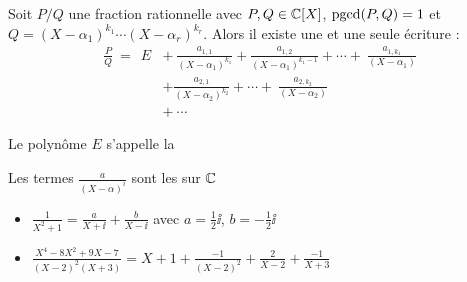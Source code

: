 \begin{frame}
\begin{theoreme}
Soit $P/Q$ une fraction rationnelle avec $P,Q \in \mathbb{C}[X]$, $\mathop{\text{pgcd}}\nolimits(P,Q)=1$ et 
$Q=(X-\alpha_1)^{k_1}\cdots(X-\alpha_r)^{k_r}$. 
Alors il existe une et une seule écriture :
\pause
$$\begin{array}{rl}
\displaystyle \frac{P}{Q} \  =  \ \  E  & + \ 
 \displaystyle  \frac{a_{1,1}}{(X-\alpha_1)^{k_1}}+\frac{a_{1,2}}{(X-\alpha_1)^{k_1-1}}+\cdots
+\ \frac{a_{1,k_1}}{(X-\alpha_1)} \\[4mm]
  & \displaystyle+ \frac{a_{2,1}}{(X-\alpha_2)^{k_2}}+\cdots
+\ \frac{a_{2,k_2}}{(X-\alpha_2)} \\[3mm]
 & + \ \cdots
\end{array}$$
\end{theoreme}

\pause

Le polynôme $E$ s'appelle la 


\pause

Les termes $\frac{a}{(X-\alpha)^i}$ sont les  sur $\mathbb{C}$

\pause

\begin{exemple}
\begin{itemize}
  \item $\frac{1}{X^2+1} = \frac{a}{X+\ii} + \frac{b}{X-\ii}$ \quad avec $a=\tfrac12 \ii$, $b=-\tfrac12\ii$

\pause 
  
  \item $\frac{X^4-8X^2+9X-7}{(X-2)^2(X+3)}= X+1 + \frac{-1}{(X-2)^2} + \frac{2}{X-2} + \frac{-1}{X+3}$
\end{itemize}
\end{exemple}
\end{frame}


